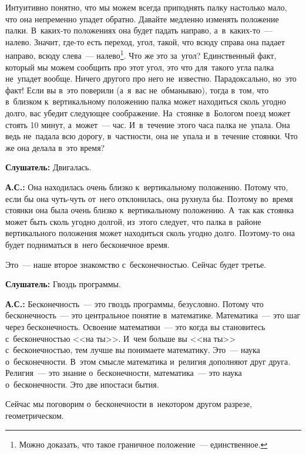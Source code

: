 Интуитивно понятно, что мы можем всегда приподнять палку настолько мало, что она непременно упадет
обратно. Давайте медленно изменять
положение палки. В~каких-то положениях она будет падать направо, а~в~каких-то~--- налево. Значит, где-то
есть переход, угол, такой, что всюду справа она падает направо, всюду слева~--- налево\footnote{Можно доказать, что такое граничное положение~--- единственное.}.
 Что же это
за~угол? Единственный факт, который мы можем сообщить про этот угол, это что для~такого угла палка
не~упадет вообще. Ничего другого про него не~известно. Парадоксально, но~это факт! Если вы в~это
поверили (а~я~вас не~обманываю), тогда в~том, что в~близком к~вертикальному положению палка может
находиться сколь угодно долго, вас убедит следующее соображение. На~стоянке в~Бологом поезд может
стоять 10 минут, а~может~--- час. И~в~течение этого часа палка не~упала. Она ведь не~падала всю
дорогу, в~частности, она не~упала и~в~течение стоянки. Что же она делала в~это время?

\textbf{Слушатель:} Двигалась.

\textbf{А.С.:} Она находилась очень близко к~вертикальному положению. Потому что, если бы она чуть-чуть
от~него отклонилась, она рухнула бы. Поэтому во~время стоянки она была очень близко к~вертикальному
положению. А~так как стоянка может быть сколь угодно долгой, из~этого следует, что палка в~районе
вертикального положения может находиться сколь угодно долго. Поэтому-то она будет подниматься
в~него бесконечное время.

Это~--- наше второе знакомство с~бесконечностью. Сейчас будет третье.

\textbf{Слушатель:} Гвоздь программы.

\textbf{А.С.:} Бесконечность~--- это гвоздь программы, безусловно. Потому что бесконечность~--- это
центральное понятие в~математике. Математика~--- это шаг через бесконечность. Освоение
математики~--- это когда вы становитесь с~бесконечностью <<на ты>>. И~чем больше вы <<на ты>>
с~бесконечностью, тем лучше вы понимаете математику. Это~--- наука о~бесконечности. В~этом смысле
математика и~религия дополняют друг друга. Религия~--- это знание о~бесконечности, математика~---
это наука о~бесконечности. Это две ипостаси бытия.

Сейчас мы поговорим о~бесконечности в~некотором другом разрезе, геометрическом.

